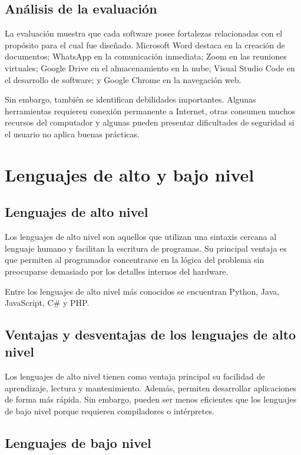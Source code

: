 \documentclass[12pt,a4paper]{article}
\begin{document}
	\subsection{Análisis de la evaluación}
	
	La evaluación muestra que cada software posee fortalezas relacionadas con el propósito para el cual fue diseñado. Microsoft Word destaca en la creación de documentos; WhatsApp en la comunicación inmediata; Zoom en las reuniones virtuales; Google Drive en el almacenamiento en la nube; Visual Studio Code en el desarrollo de software; y Google Chrome en la navegación web.
	
	Sin embargo, también se identifican debilidades importantes. Algunas herramientas requieren conexión permanente a Internet, otras consumen muchos recursos del computador y algunas pueden presentar dificultades de seguridad si el usuario no aplica buenas prácticas.
	
	\section{Lenguajes de alto y bajo nivel}
	
	\subsection{Lenguajes de alto nivel}
	
	Los lenguajes de alto nivel son aquellos que utilizan una sintaxis cercana al lenguaje humano y facilitan la escritura de programas. Su principal ventaja es que permiten al programador concentrarse en la lógica del problema sin preocuparse demasiado por los detalles internos del hardware.
	
	Entre los lenguajes de alto nivel más conocidos se encuentran Python, Java, JavaScript, C\# y PHP.
	
	\subsection{Ventajas y desventajas de los lenguajes de alto nivel}
	
	Los lenguajes de alto nivel tienen como ventaja principal su facilidad de aprendizaje, lectura y mantenimiento. Además, permiten desarrollar aplicaciones de forma más rápida. Sin embargo, pueden ser menos eficientes que los lenguajes de bajo nivel porque requieren compiladores o intérpretes.
	
	\subsection{Lenguajes de bajo nivel}
	
\end{document}
